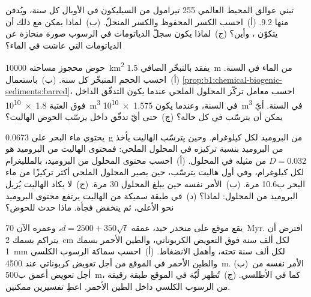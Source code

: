 \begin{exercise}[$\star\star$]\label{exo:b1:chemical-biogenic-sediments:9}
تبني عوالق المحيط العالمي 255 تيرامول من السيليكون في الأوبال كل سنة، ويُدفن منها \num{9.2}. (أ)~احسب الكسر المحفوظ والكسر المنحلّ. (ب)~لماذا يمكن مع ذلك أن يتكوّن ، وأين؟ (ج)~لماذا يكون سجلّ الدياتومات في الرسوب صورة منحازة عن الدياتومات التي عاشت في الماء؟
\end{exercise}

\begin{exercise}[$\star\star\star$]\label{exo:b1:chemical-biogenic-sediments:10}
حوض محجوز مساحته \qty{10000}{km^2} يفقد بالتبخّر الصافي \qty{1.5}{m} من الماء في السنة. (أ)~احسب الحجم المتبخّر كل سنة. (ب)~باستعمال \cref{prop:b1:chemical-biogenic-sediments:barred}، احسب معامل تركّز المحلول الملحي عندما يكون التدفّق الداخل فوق العتبة \qty{1.8e10}{m^3} في السنة، وعندما يكون \qty{1.575e10}{m^3} في السنة. أيّ  يمكن أن يترسّب في كل حالة؟ (ج)~حتى أيّ تدفّق داخل يرسّب الحوض الهاليت؟
\end{exercise}

\begin{exercise}[$\star\star\star$]\label{exo:b1:chemical-biogenic-sediments:11}
يحتوي ماء البحر على \qty{0.0673}{g} من البروميد لكل كيلوغرام. وحين يترسّب الهاليت يأخذ من البروميد بنسبة تركيزه في المحلول الملحي: فمحتوى الهاليت من البروميد هو $D = 0.032$ من مثيله في المحلول. (أ)~احسب محتوى المحلول من البروميد، بالملليغرام لكل كيلوغرام، وفي أول هاليت يترسّب، حين يصير المحلول الملحي أكثر تركيزًا من ماء البحر ب\num{10.6} مرة. (ب)~الأمر نفسه حين يبلغ المحلول 30 مرة. (ج)~لا يكاد الهاليت يُزيل البروميد من المحلول: لماذا؟ (د)~في طبقة سميكة من الهاليت يرتفع محتوى البروميد نحو الأعلى، ثم ينخفض فجأة. ماذا حدث للحوض؟
\end{exercise}

\begin{exercise}[$\star\star\star$]\label{exo:b1:chemical-biogenic-sediments:12}
يقع موقع على منحدر حيد، عمقه $d = 2500 + 350\sqrt t$، وعمره الآن \qty{70}{Myr}. افترض أن  يتراكم بسمك \qty{2}{cm} لكل ألف سنة فوق التعويض الكربوناتي، والطين الأحمر بسمك \qty{1}{mm} لكل ألف سنة تحته، وأهمل الانضغاط. (أ)~احسب سماكة الرسوب الكلسي والطين الأحمر في الموقع من أجل تعويض كربوناتي عند \qty{4500}{m}. (ب)~الأمر نفسه من أجل تعويض أعمق ب\qty{500}{m}، كما في الأطلسي. (ج)~تُظهر لُبّة في الموقع طبقة رقيقة من الرسوب الكلسي داخل الطين الأحمر. اعطِ تفسيرين ممكنين.
\end{exercise}

